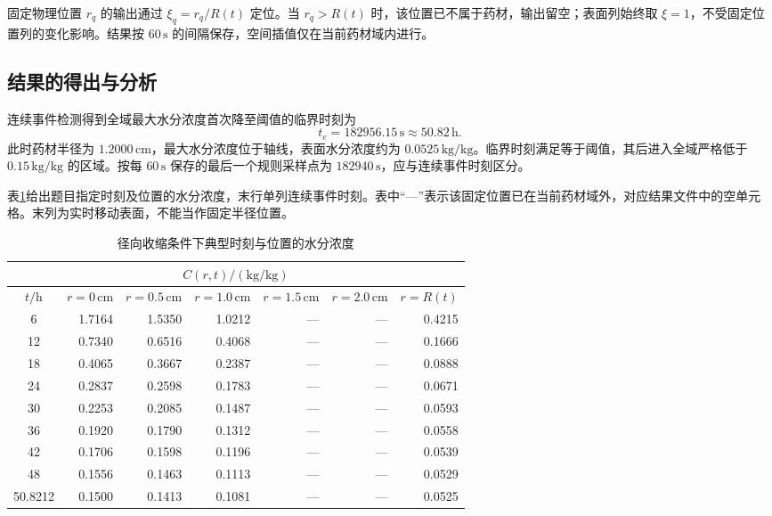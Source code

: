 固定物理位置 $r_q$ 的输出通过 $\xi_q=r_q/R(t)$ 定位。当 $r_q>R(t)$ 时，该位置已不属于药材，输出留空；表面列始终取 $\xi=1$，不受固定位置列的变化影响。结果按 $60\,\mathrm{s}$ 的间隔保存，空间插值仅在当前药材域内进行。

\subsection{结果的得出与分析}

连续事件检测得到全域最大水分浓度首次降至阈值的临界时刻为
\begin{equation}
t_e=182956.15\,\mathrm{s}\approx50.82\,\mathrm{h}.
\label{eq:q4-end-time}
\end{equation}
此时药材半径为 $1.2000\,\mathrm{cm}$，最大水分浓度位于轴线，表面水分浓度约为 $0.0525\,\mathrm{kg/kg}$。临界时刻满足等于阈值，其后进入全域严格低于 $0.15\,\mathrm{kg/kg}$ 的区域。按每 $60\,\mathrm{s}$ 保存的最后一个规则采样点为 $182940\,\mathrm{s}$，应与连续事件时刻区分。

表\ref{tab:q4-moisture}给出题目指定时刻及位置的水分浓度，末行单列连续事件时刻。表中“---”表示该固定位置已在当前药材域外，对应结果文件中的空单元格。末列为实时移动表面，不能当作固定半径位置。
\begin{table}[H]
\centering
\caption{径向收缩条件下典型时刻与位置的水分浓度}
\label{tab:q4-moisture}
\begin{tabular}{@{}crrrrrr@{}}
\toprule
\multicolumn{7}{c}{$C(r,t)/(\mathrm{kg/kg})$}\\
\midrule
$t/\mathrm{h}$ & $r=0\,\mathrm{cm}$ & $r=0.5\,\mathrm{cm}$ & $r=1.0\,\mathrm{cm}$ & $r=1.5\,\mathrm{cm}$ & $r=2.0\,\mathrm{cm}$ & $r=R(t)$ \\
\midrule
6 & 1.7164 & 1.5350 & 1.0212 & --- & --- & 0.4215 \\
12 & 0.7340 & 0.6516 & 0.4068 & --- & --- & 0.1666 \\
18 & 0.4065 & 0.3667 & 0.2387 & --- & --- & 0.0888 \\
24 & 0.2837 & 0.2598 & 0.1783 & --- & --- & 0.0671 \\
30 & 0.2253 & 0.2085 & 0.1487 & --- & --- & 0.0593 \\
36 & 0.1920 & 0.1790 & 0.1312 & --- & --- & 0.0558 \\
42 & 0.1706 & 0.1598 & 0.1196 & --- & --- & 0.0539 \\
48 & 0.1556 & 0.1463 & 0.1113 & --- & --- & 0.0529 \\
50.8212 & 0.1500 & 0.1413 & 0.1081 & --- & --- & 0.0525 \\
\bottomrule
\end{tabular}
\end{table}

